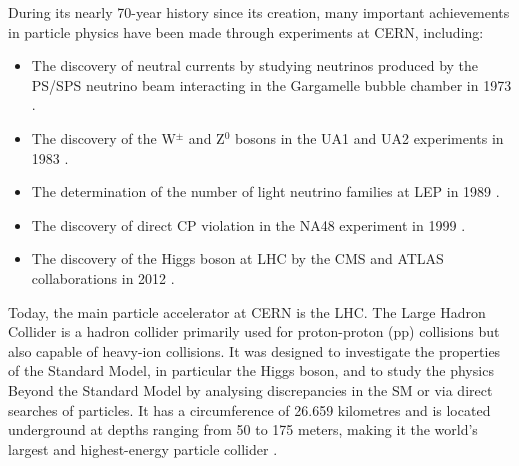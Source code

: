 During its nearly 70-year history since its creation, many important achievements in particle physics have been made through experiments at CERN, including:
\begin{itemize}
    \setlength\itemsep{0em}
    \item The discovery of neutral currents by studying neutrinos produced by the PS/SPS neutrino beam interacting in the Gargamelle bubble chamber in 1973 \cite{GargamelleNeutrino:1973jyy}.
    \item The discovery of the W$^\pm$ and Z$^0$ bosons in the UA1 and UA2 experiments in 1983 \cite{UA1:1983crd, UA2:1983tsx}.
    \item The determination of the number of light neutrino families at LEP in 1989 \cite{ALEPH:1989kcj}.
    \item The discovery of direct CP violation in the NA48 experiment in 1999 \cite{NA48:1999szy}.
    \item The discovery of the Higgs boson at LHC by the CMS and ATLAS collaborations in 2012 \cite{CMS:2012qbp,ATLAS:2012yve}.
\end{itemize}

Today, the main particle accelerator at CERN is the LHC. The Large Hadron Collider is a hadron collider primarily used for proton-proton (pp) collisions but also capable of heavy-ion collisions. It was designed to investigate the properties of the Standard Model, in particular the Higgs boson, and to study the physics Beyond the Standard Model by analysing discrepancies in the SM or via direct searches of particles. It has a circumference of 26.659 kilometres and is located underground at depths ranging from 50 to 175 meters, making it the world's largest and highest-energy particle collider \cite{Evans:2008zzb, CERN:Facts_figures}.

